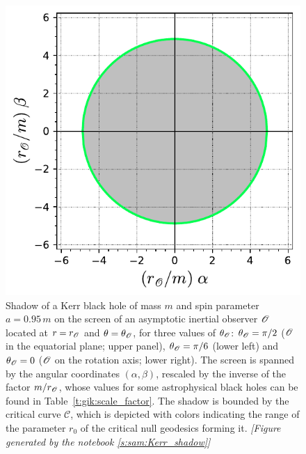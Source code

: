 \begin{figure}
\begin{center}
\includegraphics[height=0.28\textheight]{gik_shadow_a95_th00.pdf}
\end{center}
\caption[]{\label{f:gik:shadow_a95} \footnotesize
Shadow of a Kerr black hole of mass $m$ and spin parameter $a=0.95\, m$ on the screen of an asymptotic
inertial observer $\mathscr{O}$ located at $r=r_{\mathscr{O}}$ and $\theta=\theta_{\mathscr{O}}$, for three
values of $\theta_{\mathscr{O}}$: $\theta_{\mathscr{O}} = \pi/2$ ($\mathscr{O}$ in the equatorial plane; upper panel),
$\theta_{\mathscr{O}} = \pi/6$ (lower left) and $\theta_{\mathscr{O}} = 0$ ($\mathscr{O}$ on the rotation axis; lower right).
The screen is spanned by the angular coordinates $(\alpha,\beta)$, rescaled by the inverse of
the factor $m/r_{\mathscr{O}}$, whose values for some astrophysical black holes can be found in Table~\ref{t:gik:scale_factor}.
The shadow is bounded by the critical curve $\mathscr{C}$, which is depicted
with colors indicating the range of the parameter $r_0$
of the critical null geodesics forming it.
\textsl{[Figure generated by the notebook \ref{s:sam:Kerr_shadow}]}
}
\end{figure}

